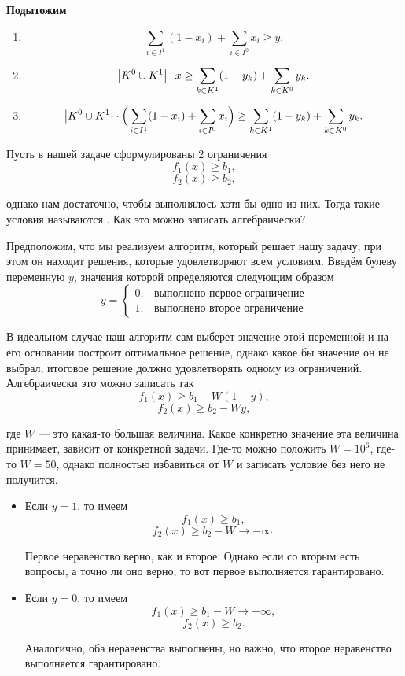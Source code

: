 \textbf{Подытожим}
\begin{enumerate}
	\item {}
	\[
		\sum_{i \in I^1}(1-x_i) + \sum_{i \in I^0}x_i \ge y.
	\]
	
	\item {}
	\[
		\abs{K^0 \cup K^1} \cdot x  \ge \sum_{k \in K^1}(1-y_k) + \sum_{k \in K^0}y_k.
	\]
	
	\item {}
	\[
		\abs{K^0 \cup K^1} \cdot \Big(\sum_{i \in I^1}(1-x_i) + \sum_{i \in I^0}x_i\Big) \ge \sum_{k \in K^1}(1-y_k) + \sum_{k \in K^0}y_k.
	\]
\end{enumerate}

\label{fact:alternative_conditions}

Пусть в нашей задаче сформулированы 2 ограничения
\[f_1(x) \ge b_1,\]
\[f_2(x) \ge b_2,\]

однако нам достаточно, чтобы выполнялось хотя бы одно из них. Тогда такие условия называются . Как это можно записать алгебраически?

Предположим, что мы реализуем алгоритм, который решает нашу задачу, при этом он находит решения, которые удовлетворяют всем условиям. Введём булеву переменную $y$, значения которой определяются следующим образом 
\[
	y = \begin{cases}
		0,& \text{выполнено первое ограничение}\\
		1,&\text{выполнено второе ограничение}
	\end{cases}
\]

В идеальном случае наш алгоритм сам выберет значение 
этой переменной и на его основании построит оптимальное решение, однако какое бы значение он не выбрал, итоговое решение должно удовлетворять одному из ограничений. Алгебраически это можно записать так
\[f_1(x) \ge b_1 - W(1-y),\]
\[f_2(x) \ge b_2 - Wy,\]

где $W$ --- это какая-то большая величина. Какое конкретно значение эта величина принимает, зависит от конкретной задачи. Где-то можно положить $W = 10^6$, где-то $W = 50$, однако полностью избавиться от $W$ и записать условие без него не получится.

\begin{itemize}[nosep]
	\item Если $y = 1$, то имеем
	\[f_1(x) \ge b_1,\]
	\[f_2(x) \ge b_2 - W \to -\infty.\]
	
	Первое неравенство верно, как и второе. Однако если со вторым есть вопросы, а точно ли оно верно, то вот первое выполняется гарантировано.
	
	\item Если $y = 0$, то имеем
	\[f_1(x) \ge b_1 - W \to -\infty,\]
	\[f_2(x) \ge b_2.\]
	
	Аналогично, оба неравенства выполнены, но важно, что второе неравенство выполняется гарантировано.
	
\end{itemize}

